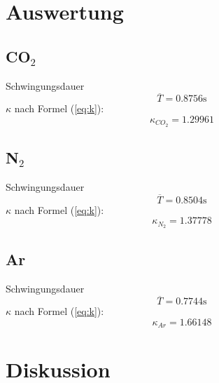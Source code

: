 \documentclass[12pt,a4paper]{article}
\begin{document}
\section*{Auswertung}
\subsection*{CO$_2$}
Schwingungsdauer
\[ \overline{T} = 0.8756\mbox{s} \]
$\kappa$ nach Formel (\ref{eq:k}):
\[ \kappa_{CO_2} = 1.29961 \]

\subsection*{N$_2$}
Schwingungsdauer
\[ \overline{T} = 0.8504\mbox{s} \]
$\kappa$ nach Formel (\ref{eq:k}):
\[ \kappa_{N_2} = 1.37778 \]

\subsection*{Ar}
Schwingungsdauer
\[ \overline{T} = 0.7744\mbox{s} \]
$\kappa$ nach Formel (\ref{eq:k}):
\[ \kappa_{Ar} = 1.66148 \]

\section*{Diskussion}
\end{document}
